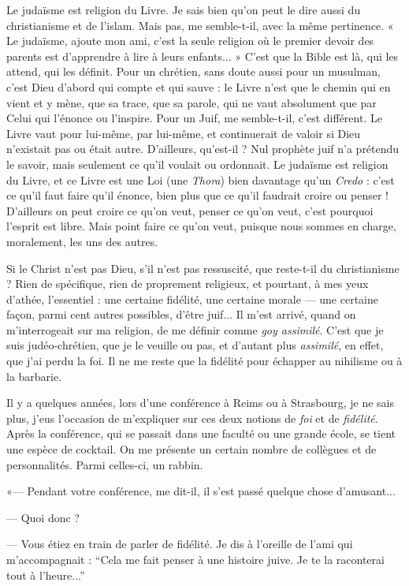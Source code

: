 {Le judaïsme est religion du Livre. Je sais bien qu’on peut le dire aussi du
christianisme et de l’islam. Mais pas, me semble-t-il, avec la même pertinence.
« Le judaïsme, ajoute mon ami, c’est la seule religion où le premier devoir des
parents est d’apprendre à lire à leurs enfants... » C’est que la Bible est là, qui
les attend, qui les définit. Pour un chrétien, sans doute aussi pour un
musulman, c’est Dieu d’abord qui compte et qui sauve : le Livre n’est que le
chemin qui en vient et y mène, que sa trace, que sa parole, qui ne vaut absolument
que par Celui qui l’énonce ou l’inspire. Pour un Juif, me semble-t-il, c’est
différent. Le Livre vaut pour lui-même, par lui-même, et continuerait de valoir
si Dieu n'existait pas ou était autre. D’ailleurs, qu’est-il ? Nul prophète juif n’a
prétendu le savoir, mais seulement ce qu’il voulait ou ordonnait. Le judaïsme
est religion du Livre, et ce Livre est une Loi (une {\it Thora}) bien davantage qu’un
{\it Credo} : c’est ce qu’il faut faire qu’il énonce, bien plus que ce qu’il faudrait
croire ou penser ! D'ailleurs on peut croire ce qu’on veut, penser ce qu’on veut,
c'est pourquoi l'esprit est libre. Mais point faire ce qu’on veut, puisque nous
sommes en charge, moralement, les uns des autres.

Si le Christ n’est pas Dieu, s’il n’est pas ressuscité, que reste-t-il du
christianisme ? Rien de spécifique, rien de proprement religieux, et pourtant, à
mes yeux d’athée, l’essentiel : une certaine fidélité, une certaine morale — une
certaine façon, parmi cent autres possibles, d’être juif... Il m’est arrivé, quand
on m'interrogeait sur ma religion, de me définir comme {\it goy assimilé}. C’est que
je suis judéo-chrétien, que je le veuille ou pas, et d’autant plus {\it assimilé}, en effet,
que j'ai perdu la foi. Il ne me reste que la fidélité pour échapper au nihilisme
ou à la barbarie.

Il y a quelques années, lors d’une conférence à Reims ou à Strasbourg, je ne
sais plus, j’eus l’occasion de m'expliquer sur ces deux notions de {\it foi} et de {\it fidélité}.
Après la conférence, qui se passait dans une faculté ou une grande école, se
tient une espèce de cocktail. On me présente un certain nombre de collègues et
de personnalités. Parmi celles-ci, un rabbin.

«— Pendant votre conférence, me dit-il, il s’est passé quelque chose d’amusant...

— Quoi donc ?

— Vous étiez en train de parler de fidélité. Je dis à l’oreille de l'ami qui
m'accompagnait : “Cela me fait penser à une histoire juive. Je te la raconterai
tout à l’heure...”

}
